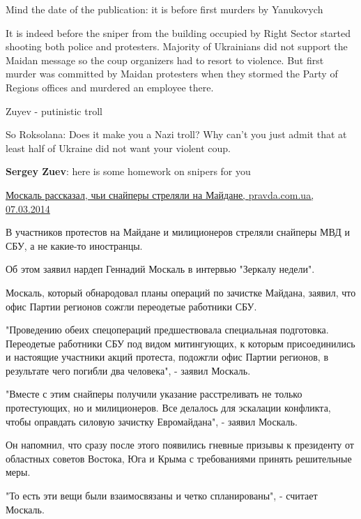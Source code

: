 \begin{itemize}
\begin{itemize} %
Mind the date of the publication: it is before first murders by Yanukovych


It is indeed before the sniper from the building occupied by Right Sector
started shooting both police and protesters. Majority of Ukrainians did not
support the Maidan message so the coup organizers had to resort to violence.
But first murder was committed by Maidan protesters when they stormed the Party
of Regions offices and murdered an employee there.


Zuyev - putinistic troll

So Roksolana: Does it make you a Nazi troll? Why can't you just admit that at least half of Ukraine did not want your violent coup.

\textbf{Sergey Zuev}: here is some homework on snipers for you

\href{https://www.pravda.com.ua/rus/news/2014/03/7/7018031/}{%
Москаль рассказал, чьи снайперы стреляли на Майдане, pravda.com.ua, 07.03.2014%
}

\begin{multicols}{2}
В участников протестов на Майдане и милиционеров стреляли снайперы МВД и СБУ, а
не какие-то иностранцы.

Об этом заявил нардеп Геннадий Москаль в интервью "Зеркалу недели".

Москаль, который обнародовал планы операций по зачистке Майдана, заявил, что
офис Партии регионов сожгли переодетые работники СБУ.

"Проведению обеих спецопераций предшествовала специальная подготовка.
Переодетые работники СБУ под видом митингующих, к которым присоединились и
настоящие участники акций протеста, подожгли офис Партии регионов, в результате
чего погибли два человека", - заявил Москаль.

"Вместе с этим снайперы получили указание расстреливать не только протестующих,
но и милиционеров. Все делалось для эскалации конфликта, чтобы оправдать
силовую зачистку Евромайдана", - заявил Москаль.

Он напомнил, что сразу после этого появились гневные призывы к президенту от
областных советов Востока, Юга и Крыма с требованиями принять решительные меры.

"То есть эти вещи были взаимосвязаны и четко спланированы", - считает Москаль.


\end{multicols}
\end{itemize}
\end{itemize}
